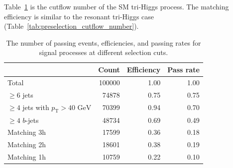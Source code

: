 \documentclass[12pt]{article}
\begin{document}
    Table~\ref{tab:preselection_cutflow_number_sm} is the cutflow number of the SM tri-Higgs process. The matching efficiency is similar to the resonant tri-Higgs case (Table~\ref{tab:preselection_cutflow_number}).
    \begin{table}[htpb]
        \centering
        \caption{The number of passing events, efficiencies, and passing rates for signal processes at different selection cuts.}
        \label{tab:preselection_cutflow_number_sm}
        \begin{tabular}{l|rrr}
                                                         & Count  & Efficiency & Pass rate \\ \hline
        Total                                            & 100000 & 1.00       & 1.00      \\
        $\ge 6$ jets                                     & 74878  & 0.75       & 0.75      \\
        $\ge 4$ jets with $p_{\text{T}} > \text{40 GeV}$ & 70399  & 0.94       & 0.70      \\
        $\ge 4$ $b$-jets                                 & 48734  & 0.69       & 0.49      \\ \hline
        Matching 3h                                      & 17599  & 0.36       & 0.18      \\
        Matching 2h                                      & 18601  & 0.38       & 0.19      \\
        Matching 1h                                      & 10759  & 0.22       & 0.10      \\
        \end{tabular}
    \end{table}
\end{document}
